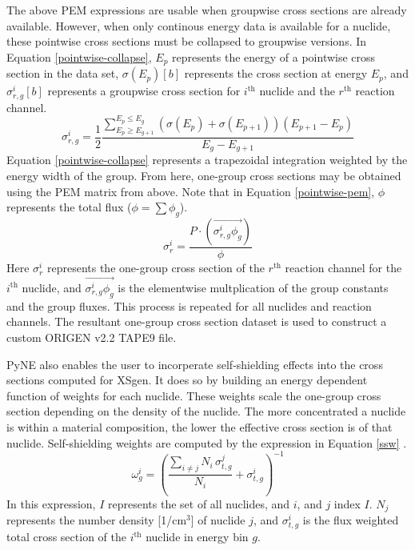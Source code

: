 \documentclass{article}
\begin{document}
The above PEM expressions are usable when groupwise cross sections are already available.
However, when only continous energy data is available for a nuclide, these pointwise
cross sections must be collapsed to groupwise versions.
In Equation \ref{pointwise-collapse}, $E_p$ represents the energy of a pointwise cross section
in the data set,
$\sigma(E_p)[b]$ represents the cross section at energy $E_p$, and $\sigma_{r,g}^i[b]$ represents a
groupwise cross section for $i^\mathrm{th}$ nuclide and the $r^\mathrm{th}$ reaction channel.
\begin{equation}
\label{pointwise-collapse}
\sigma_{r,g}^i = \frac{1}{2} \frac{\sum_{E_p\ge E_{g+1}}^{E_p\le E_g}
                                   \left(\sigma(E_p)+\sigma(E_{p+1})\right)
                                   \left(E_{p+1}-E_{p}\right)}
                                  {E_g-E_{g+1}}
\end{equation}
Equation \ref{pointwise-collapse} represents a trapezoidal integration weighted by the
energy width of the group. From here, one-group cross sections may be obtained using the PEM
matrix from above. Note that in Equation \ref{pointwise-pem}, $\phi$ represents the total
flux ($\phi=\sum\phi_g$).
\begin{equation}
\label{pointwise-pem}
\sigma_{r}^i=\frac{P \cdot (\overrightarrow{\sigma_{r,g}^i \phi_g})}{\phi}
\end{equation}
Here $\sigma_{r}^i$ represents the one-group cross section of the $r^\mathrm{th}$ reaction
channel for the $i^\mathrm{th}$ nuclide, and $\overrightarrow{\sigma_{r,g}^i \phi_g}$ is the
elementwise multplication of the group constants and the group fluxes.
This process is repeated for all nuclides and reaction channels. The resultant one-group
cross section dataset is used to construct a custom ORIGEN v2.2 TAPE9 file\cite{origen2}.

PyNE also enables the user to incorperate self-shielding effects \cite{bondarenko} into the cross sections
computed for XSgen. It does so by building an energy dependent function of weights for each
nuclide. These weights scale the one-group cross section depending on the density of the
nuclide. The more concentrated a nuclide is within a material composition, the lower the
effective cross section is of that nuclide. Self-shielding weights are computed by the
expression in Equation \ref{ssw} \cite{weights}.
\begin{equation}
\label{ssw}
\omega_{g}^i=\left(\frac{\sum_{i\neq j}N_i \, \sigma_{t,g}^j}{N_i}+\sigma_{t,g}^i\right)^{-1}
\end{equation}
In this expression, $I$ represents the set of all nuclides, and $i$, and $j$ index $I$.
 $N_j$ represents the number density [1/cm$^3$] of
nuclide $j$, and $\sigma_{t,g}^i$ is the flux weighted total cross section of
the $i^\mathrm{th}$ nuclide in energy bin $g$.
\end{document}
